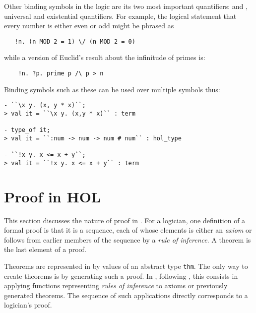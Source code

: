 Other binding symbols in the logic are its two most important
quantifiers: \ml{!} and , universal and existential quantifiers.
For example, the logical statement that every number is either even or
odd might be phrased as
{\small
\begin{verbatim}
   !n. (n MOD 2 = 1) \/ (n MOD 2 = 0)
\end{verbatim}}
%
while a version of Euclid's result about the infinitude of primes is:
%
{\small
\begin{verbatim}
    !n. ?p. prime p /\ p > n
\end{verbatim}}
%
Binding symbols such as these can be used over multiple symbols
thus:

\begin{session}\begin{verbatim}
- ``\x y. (x, y * x)``;
> val it = ``\x y. (x,y * x)`` : term

- type_of it;
> val it = ``:num -> num -> num # num`` : hol_type

- ``!x y. x <= x + y``;
> val it = ``!x y. x <= x + y`` : term
\end{verbatim}\end{session}


\section{Proof in HOL}

\newcommand\tacticline{\hline \hline}
\newenvironment{proofenumerate}{\begin{enumerate}}{\end{enumerate}}

\setcounter{sessioncount}{0}

This section discusses the nature of proof in \HOL{}. For a logician,
one definition of a formal proof is that it is a sequence, each of
whose elements is either an {\it axiom\/} or follows from earlier
members of the sequence by a {\it rule of inference\/}.  A theorem is
the last element of a proof.

Theorems are represented in \HOL{} by values of an abstract type
{\small\verb|thm|}.  The only way to create theorems is by generating
such a proof.  In \HOL, following \LCF, this consists in applying
\ML{} functions representing {\it rules of inference\/} to axioms or
previously generated theorems.  The sequence of such applications
directly corresponds to a logician's proof.

